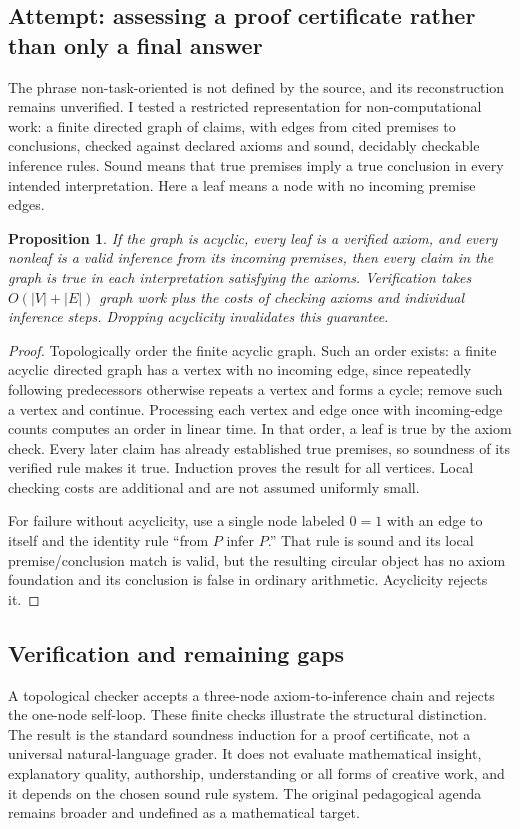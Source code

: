 \documentclass[11pt]{article}
\newtheorem{proposition}{Proposition}
\begin{document}
\subsection{Attempt: assessing a proof certificate rather than only a final answer}
The phrase non-task-oriented is not defined by the source, and its reconstruction remains unverified. I tested a restricted representation for non-computational work: a finite directed graph of claims, with edges from cited premises to conclusions, checked against declared axioms and sound, decidably checkable inference rules. Sound means that true premises imply a true conclusion in every intended interpretation. Here a leaf means a node with no incoming premise edges.
\begin{proposition}
If the graph is acyclic, every leaf is a verified axiom, and every nonleaf is a valid inference from its incoming premises, then every claim in the graph is true in each interpretation satisfying the axioms. Verification takes $O(|V|+|E|)$ graph work plus the costs of checking axioms and individual inference steps. Dropping acyclicity invalidates this guarantee.
\end{proposition}
\begin{proof}
Topologically order the finite acyclic graph. Such an order exists: a finite acyclic directed graph has a vertex with no incoming edge, since repeatedly following predecessors otherwise repeats a vertex and forms a cycle; remove such a vertex and continue. Processing each vertex and edge once with incoming-edge counts computes an order in linear time. In that order, a leaf is true by the axiom check. Every later claim has already established true premises, so soundness of its verified rule makes it true. Induction proves the result for all vertices. Local checking costs are additional and are not assumed uniformly small.

For failure without acyclicity, use a single node labeled $0=1$ with an edge to itself and the identity rule ``from $P$ infer $P$.'' That rule is sound and its local premise/conclusion match is valid, but the resulting circular object has no axiom foundation and its conclusion is false in ordinary arithmetic. Acyclicity rejects it.
\end{proof}
\subsection{Verification and remaining gaps}
A topological checker accepts a three-node axiom-to-inference chain and rejects the one-node self-loop. These finite checks illustrate the structural distinction. The result is the standard soundness induction for a proof certificate, not a universal natural-language grader. It does not evaluate mathematical insight, explanatory quality, authorship, understanding or all forms of creative work, and it depends on the chosen sound rule system. The original pedagogical agenda remains broader and undefined as a mathematical target.
\end{document}
